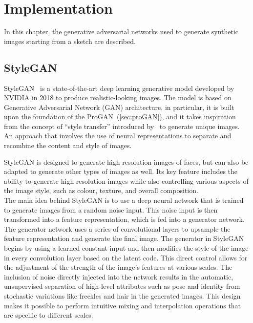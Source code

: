 \newpage
\section{Implementation}
\label{sec:used GAN discussion}
In this chapter, the generative adversarial networks used to generate synthetic images starting from a sketch are described. 
\subsection{StyleGAN}
\label{section:StyleGAN}
StyleGAN~\cite{StyleGAN} is a state-of-the-art deep learning generative model developed by NVIDIA in 2018 to produce realistic-looking images. The model is based on Generative Adversarial Network (GAN) architecture, in particular, it is built upon the foundation of the ProGAN~(\ref{sec:proGAN}), and it takes inspiration from the concept of “style transfer” introduced by~\cite{ImageStyleTransfer} to generate unique images. An approach that involves the use of neural representations to separate and recombine the content and style of images.

\noindent StyleGAN is designed to generate high-resolution images of faces, but can also be adapted to generate other types of images as well. Its key feature includes the ability to generate high-resolution images while also controlling various aspects of the image style, such as colour, texture, and overall composition. \\

\noindent The main idea behind StyleGAN is to use a deep neural network that is trained to generate images from a random noise input. This noise input is then transformed into a feature representation, which is fed into a generator network. The generator network uses a series of convolutional layers to upsample the feature representation and generate the final image. 
The generator in StyleGAN begins by using a learned constant input and then modifies the style of the image in every convolution layer based on the latent code. This direct control allows for the adjustment of the strength of the image's features at various scales. 
The inclusion of noise directly injected into the network results in the automatic, unsupervised separation of high-level attributes such as pose and identity from stochastic variations like freckles and hair in the generated images. This design makes it possible to perform intuitive mixing and interpolation operations that are specific to different scales.

